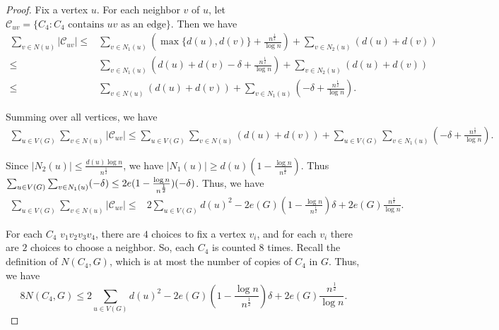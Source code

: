 \documentclass[11pt,a4paper]{article}
\theoremstyle{definition}
\begin{document}
\begin{proof}
            Fix a vertex $u$. 
            For each neighbor $v$ of $u$, let $\mathcal{C}_{uv} = \{C_4: C_4 \text{ contains $uv$ as an edge}\}$. 
            Then we have
            \begin{align*}
                \sum_{v \in N(u)} |\mathcal{C}_{uv}| 
                \leq& \sum_{v \in N_1(u)} \left(\max \{d(u), d(v)\} + \frac{n^{\frac{1}{2}}}{\log n} \right) + \sum_{v \in N_2(u)} (d(u) + d(v)) \\
                \leq& \sum_{v \in N_1(u)} \left(d(u) + d(v) - \delta + \frac{n^{\frac{1}{2}}}{\log n} \right) + \sum_{v \in N_2(u)} (d(u) + d(v)) \\
                \leq& \sum_{v \in N(u)} (d(u) + d(v)) + \sum_{v \in N_1(u)} \left(- \delta + \frac{n^{\frac{1}{2}}}{\log n} \right).
            \end{align*}

            Summing over all vertices, we have
            \begin{align*}
                \sum_{u \in V(G)} \sum_{v \in N(u)} |\mathcal{C}_{uv}| 
                \leq \sum_{u \in V(G)} \sum_{v \in N(u)} (d(u) + d(v)) + \sum_{u \in V(G)} \sum_{v \in N_1(u)} \left(- \delta + \frac{n^{\frac{1}{2}}}{\log n} \right).
            \end{align*}

            Since $|N_2(u)| \leq \frac{d(u) \log n}{n^{\frac{1}{2}}}$, we have $|N_1(u)| \geq d(u) (1 - \frac{\log n}{n^{\frac{1}{2}}})$.
            Thus $\sum_{u \in V(G)} \sum_{v \in N_1(u)} (- \delta) \\ \leq 2e (1 - \frac{\log n}{n^{\frac{1}{2}}}) (- \delta)$.
            Thus, we have
            \begin{align*}
                \sum_{u \in V(G)} \sum_{v \in N(u)} |\mathcal{C}_{uv}|
                \leq& 2 \sum_{u \in V(G)} d(u)^2 - 2e(G) \left(1 - \frac{\log n}{n^{\frac{1}{2}}} \right) \delta + 2e(G) \frac{n^{\frac{1}{2}}}{\log n}.
            \end{align*}

            For each $C_4$ $v_1 v_2 v_3 v_4$, there are $4$ choices to fix a vertex $v_i$, and for each $v_i$ there are $2$ choices to choose a neighbor.
            So, each $C_4$ is counted $8$ times.
            Recall the definition of $N(C_4, G)$, which is at most the number of copies of $C_4$ in $G$.
            Thus, we have
            \begin{equation*}
                8 N(C_4, G) \leq 2 \sum_{u \in V(G)} d(u)^2 - 2e(G) \left(1 - \frac{\log n}{n^{\frac{1}{2}}}\right) \delta + 2e(G) \frac{n^{\frac{1}{2}}}{\log n}.
            \end{equation*}


\end{proof}
\end{document}
